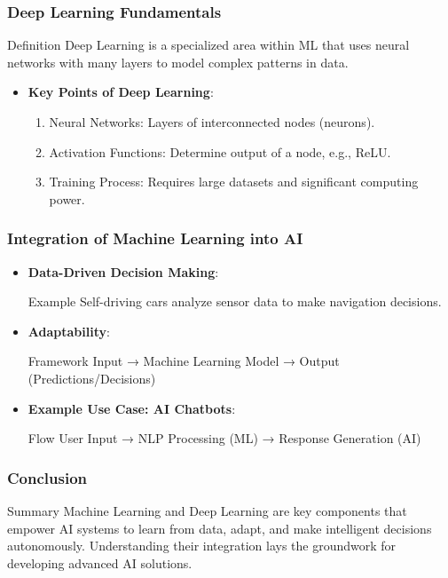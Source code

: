 \documentclass[aspectratio=169]{beamer}
\begin{document}
\begin{frame}[fragile]
    \frametitle{Deep Learning Fundamentals}
    \begin{block}{Definition}
        Deep Learning is a specialized area within ML that uses neural networks with many layers to model complex patterns in data.
    \end{block}

    \begin{itemize}
        \item \textbf{Key Points of Deep Learning}:
        \begin{enumerate}
            \item Neural Networks: Layers of interconnected nodes (neurons).
            \item Activation Functions: Determine output of a node, e.g., ReLU.
            \item Training Process: Requires large datasets and significant computing power.
        \end{enumerate}
    \end{itemize}
\end{frame}

\begin{frame}[fragile]
    \frametitle{Integration of Machine Learning into AI}
    \begin{itemize}
        \item \textbf{Data-Driven Decision Making}:
        \begin{block}{Example}
            Self-driving cars analyze sensor data to make navigation decisions.
        \end{block}
        
        \item \textbf{Adaptability}:
        \begin{block}{Framework}
            Input → Machine Learning Model → Output (Predictions/Decisions)
        \end{block}

        \item \textbf{Example Use Case: AI Chatbots}:
        \begin{block}{Flow}
            User Input → NLP Processing (ML) → Response Generation (AI)
        \end{block}
    \end{itemize}
\end{frame}

\begin{frame}[fragile]
    \frametitle{Conclusion}
    \begin{block}{Summary}
        Machine Learning and Deep Learning are key components that empower AI systems to learn from data, adapt, and make intelligent decisions autonomously. Understanding their integration lays the groundwork for developing advanced AI solutions.
    \end{block}
\end{frame}
\end{document}
